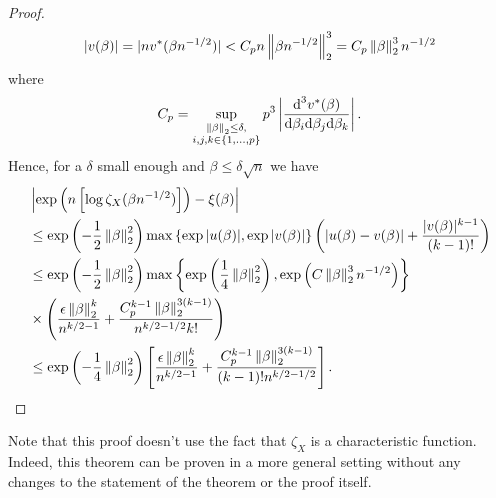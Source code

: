 \begin{proof}
    \begin{equation*}
        |v(\beta)| = |nv^*(\beta n^{-1/2})| < C_p n \left\lVert\beta n^{-1/2}\right\rVert_2^3 = C_p \left\lVert\beta\right\rVert_2^3 n^{-1/2}
    \end{equation*}
    where
    \begin{equation*}
        C_p = \sup_{\substack{\left\lVert\beta\right\rVert_2 \leq \delta, \\ i,j,k \in \{1,\ldots,p\}}} p^3\left| \frac{\text{d}^3v^*(\beta)}{\text{d}\beta_i\text{d}\beta_j\text{d}\beta_k}\right|.
    \end{equation*}
    Hence, for a $\delta$ small enough and $\beta \leq \delta\sqrt{n}$ we have
    \begin{align*}
        &\left|\exp\left(n\left[\log \zeta_X(\beta n^{-1/2})\right]\right) - \xi(\beta)\right| \\
        &\leq \exp\left(-\frac{1}{2}\left\lVert\beta\right\rVert_2^2\right) \max \left\{ \exp{|u(\beta)|}, \exp{|v(\beta)|} \right\}\left(\left|u(\beta) - v(\beta)\right| + \frac{|v(\beta)|^{k-1}}{(k-1)!}\right)\\
        &\leq \exp\left(-\frac{1}{2}\left\lVert\beta\right\rVert_2^2\right)
            \max \left\{ 
                \exp\left(\frac{1}{4}\left\lVert\beta\right\rVert_2^2\right),
                \exp\left(C \left\lVert\beta\right\rVert_2^3 n^{-1/2}\right)
            \right\}\\
        & \times \left(
                \frac{\epsilon\left\lVert\beta\right\rVert_2^k}{n^{k/2-1}}
                +
                \frac{C_p^{k-1} \left\lVert\beta\right\rVert_2^{3(k-1)} }{n^{k/2-1/2} k!}
              \right)\\
        & \leq \exp\left(-\frac{1}{4}\left\lVert\beta\right\rVert_2^2\right)\left[ \frac{\epsilon\left\lVert\beta\right\rVert_2^k}{n^{k/2-1}} + \frac{C_p^{k-1}\left\lVert\beta\right\rVert_2^{3(k-1)}}{(k-1)!n^{k/2-1/2}} \right].
    \end{align*}
\end{proof}

Note that this proof doesn't use the fact that $\zeta_X$ is a characteristic function. Indeed, this theorem can be proven in a more general setting without any changes to the statement of the theorem or the proof itself.